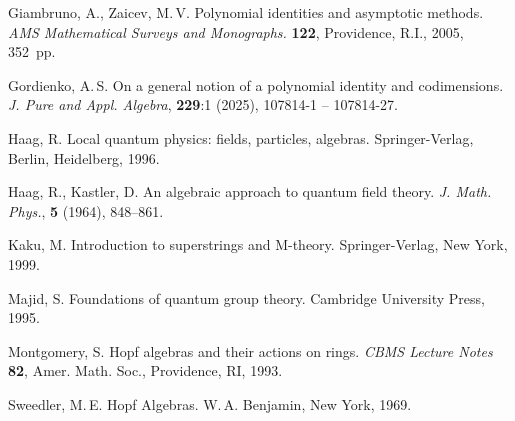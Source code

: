 \documentclass[12pt, reqno, a4paper, oneside, notitlepage]{amsart}
\theoremstyle{mytheoremstyle}
\theoremstyle{myremarkstyle}
\numberwithin{equation}{section}
\begin{document}
\begin{thebibliography}{99}
      Giambruno, A., Zaicev, M.\,V.
Polynomial identities and asymptotic methods.
\textit{AMS Mathematical Surveys and Monographs.} \textbf{122},
Providence, R.I., 2005, 352~pp.


Gordienko, A.\,S.
On a general notion of a polynomial identity and codimensions.
\textit{J. Pure and Appl. Algebra}, \textbf{229}:1 (2025), 107814-1 -- 107814-27.


 Haag, R. Local quantum physics: fields, particles, algebras.
Springer-Verlag, Berlin, Heidelberg, 1996.

 
 Haag, R., Kastler, D. An algebraic approach to quantum field theory.
\textit{J. Math. Phys.}, \textbf{5} (1964), 848--861.


 Kaku, M. Introduction to superstrings and M-theory. Springer-Verlag, New York, 1999.


 Majid, S. Foundations of quantum group theory. Cambridge University Press, 1995.



 Montgomery, S. Hopf algebras and their actions on rings. \textit{CBMS Lecture Notes} \textbf{82}, Amer. Math. Soc., Providence, RI, 1993.


 Sweedler, M.\,E. Hopf Algebras. W.\,A. Benjamin, New York, 1969.


\end{thebibliography}
\end{document}
